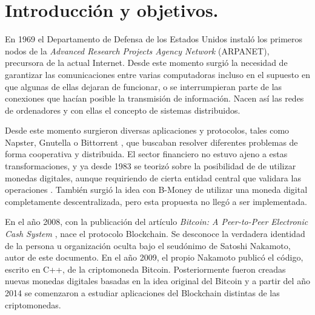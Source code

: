 
\cleardoublepage



\chapter{Introducción y objetivos.}
\label{introduccion}

En 1969 el Departamento de Defensa de los Estados Unidos instaló los primeros nodos de la \textit{Advanced Research Projects Agency Network} (ARPANET), precursora de la actual Internet. Desde este momento surgió la necesidad de garantizar las comunicaciones entre varias computadoras incluso en el supuesto en que algunas de ellas dejaran de funcionar, o se interrumpieran parte de las conexiones que hacían posible la transmisión de información\citep{arpanet}. Nacen así las redes de ordenadores y con ellas el concepto de sistemas distribuidos.

Desde este momento surgieron diversas aplicaciones y protocolos, tales como Napster, Gnutella o Bittorrent \citep{redes_p2p}, que buscaban resolver diferentes problemas de forma cooperativa y distribuida. El sector financiero no estuvo ajeno a estas transformaciones, y ya desde 1983 se teorizó sobre la posibilidad de de utilizar monedas digitales, aunque requiriendo de cierta entidad central que validara las operaciones \citep{chaum1983blind}. También surgió la idea con B-Money \citep{b_money} de utilizar una moneda digital completamente descentralizada, pero esta propuesta no llegó a ser implementada.



En el año 2008, con la publicación del artículo \textit{Bitcoin: A Peer-to-Peer Electronic Cash System} \citep{bitcoin}, nace el protocolo Blockchain. Se desconoce la verdadera identidad de la persona u organización oculta bajo el seudónimo de Satoshi Nakamoto, autor de este documento. %
En el año 2009, el propio Nakamoto publicó el código, escrito en C++, de la criptomoneda Bitcoin. Posteriormente fueron creadas nuevas monedas digitales basadas en la idea original del Bitcoin y a partir del año 2014 se comenzaron a estudiar aplicaciones del Blockchain distintas de las criptomonedas.

